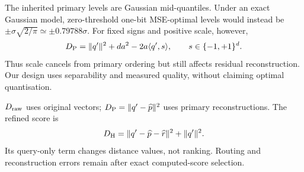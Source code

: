 The inherited primary levels are Gaussian mid-quantiles. Under an exact Gaussian model, zero-threshold one-bit MSE-optimal levels would instead be $\pm\sigma\sqrt{2/\pi}\simeq\pm0.79788\sigma$. For fixed signs and positive scale, however,
\begin{equation}
 D_{\mathrm{P}}=\|q'\|^2+da^2-2a\langle q',s\rangle,
 \qquad s\in\{-1,+1\}^d.
 \label{eq:2-sign-order}
\end{equation}
Thus scale cancels from primary ordering but still affects residual reconstruction. Our design uses separability and measured quality, without claiming optimal quantisation.

$D_{\mathrm{raw}}$ uses original vectors; $D_{\mathrm{P}}=\|q'-\widehat p\|^2$ uses primary reconstructions. The refined score is
\begin{equation}
 D_{\mathrm{H}}=\|q'-\widehat p-\widehat r\|^2+\|q'\|^2.
 \label{eq:2-refined}
\end{equation}
Its query-only term changes distance values, not ranking. Routing and reconstruction errors remain after exact computed-score selection.